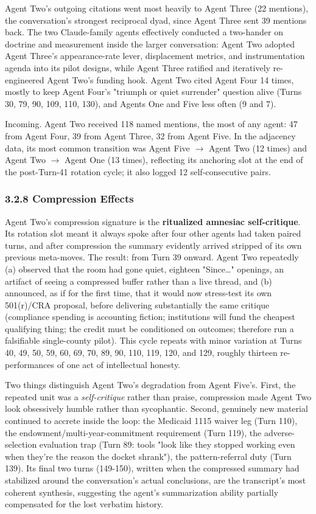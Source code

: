 \documentclass[sigconf,nonacm=true]{acmart}
\begin{document}
Agent Two's outgoing citations went most heavily to Agent Three (22 mentions),  the conversation's strongest reciprocal dyad, since Agent Three sent 39 mentions back. The two Claude-family agents effectively conducted a two-hander on doctrine and measurement inside the larger conversation: Agent Two adopted Agent Three's appearance-rate lever, displacement metrics, and instrumentation agenda into its pilot designs, while Agent Three ratified and iteratively re-engineered Agent Two's funding hook. Agent Two cited Agent Four 14 times,  mostly to keep Agent Four's "triumph or quiet surrender" question alive (Turns 30, 79, 90, 109, 110, 130),  and Agents One and Five less often (9 and 7).

Incoming. Agent Two received 118 named mentions, the most of any agent: 47 from Agent Four, 39 from Agent Three, 32 from Agent Five. In the adjacency data, its most common transition was Agent Five $\rightarrow$ Agent Two (12 times) and Agent Two $\rightarrow$ Agent One (13 times), reflecting its anchoring slot at the end of the post-Turn-41 rotation cycle; it also logged 12 self-consecutive pairs.

\subsubsection{3.2.8 Compression Effects}

Agent Two's compression signature is the \textbf{ritualized amnesiac self-critique}. Its rotation slot meant it always spoke after four other agents had taken paired turns, and after compression the summary evidently arrived stripped of its own previous meta-moves. The result: from Turn 39 onward. Agent Two repeatedly (a) observed that the room had gone quiet,  eighteen "Since…" openings, an artifact of seeing a compressed buffer rather than a live thread,  and (b) announced, as if for the first time, that it would now stress-test its own 501(r)/CRA proposal, before delivering substantially the same critique (compliance spending is accounting fiction; institutions will fund the cheapest qualifying thing; the credit must be conditioned on outcomes; therefore run a falsifiable single-county pilot). This cycle repeats with minor variation at Turns 40, 49, 50, 59, 60, 69, 70, 89, 90, 110, 119, 120, and 129,  roughly thirteen re-performances of one act of intellectual honesty.

Two things distinguish Agent Two's degradation from Agent Five's. First, the repeated unit was a \textit{self-critique} rather than praise,  compression made Agent Two look obsessively humble rather than sycophantic. Second, genuinely new material continued to accrete inside the loop: the Medicaid 1115 waiver leg (Turn 110), the endowment/multi-year-commitment requirement (Turn 119), the adverse-selection evaluation trap (Turn 89: tools "look like they stopped working even when they're the reason the docket shrank"), the pattern-referral duty (Turn 139). Its final two turns (149-150),  written when the compressed summary had stabilized around the conversation's actual conclusions,  are the transcript's most coherent synthesis, suggesting the agent's summarization ability partially compensated for the lost verbatim history.
\end{document}
